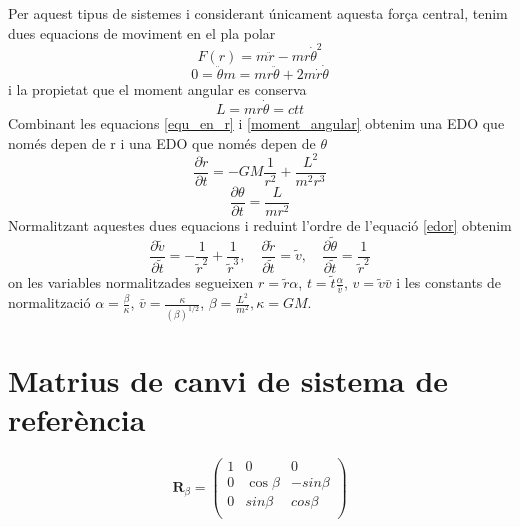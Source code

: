 \documentclass[11pt]{article}
\begin{document}
Per aquest tipus de sistemes i considerant únicament aquesta força central, tenim dues equacions de moviment en el pla polar 
\begin{equation}
    F(r)=m\ddot{r}-mr{\dot{\theta}}^2
    \label{equ_en_r}
\end{equation}
\begin{equation}
    0=\ddot{\theta}m=mr\ddot{\theta}+2m\dot{r}\dot{\theta}
    \label{equ_en_theta}
\end{equation}
i la propietat que el moment angular es conserva
\begin{equation}
    L=mr\dot{\theta}=ctt
    \label{moment_angular}
\end{equation}
Combinant les equacions \eqref{equ_en_r} i \eqref{moment_angular} obtenim una EDO que només depen de r i una EDO que només depen de $\theta$
\begin{equation}
    \frac{\partial\dot{r}}{\partial t}=-GM\frac{1}{r^2}+\frac{L^2}{m^2r^3}
    \label{edor}
\end{equation}
\begin{equation}
    \frac{\partial\theta}{\partial t}=\frac{L}{mr^2}
    \label{edot}
\end{equation}
Normalitzant aquestes dues equacions i reduint l'ordre de l'equació \eqref{edor} obtenim
\begin{equation}
    \frac{\partial\tilde{v}}{\partial\tilde{t}}=-\frac{1}{\tilde{r}^2}+\frac{1}{\tilde{r}^3}, \quad
    \frac{\partial\tilde{r}}{\partial\tilde{t}}=\tilde{v}, \quad
    \frac{\partial\tilde{\theta}}{\partial\tilde{t}}=\frac{1}{\tilde{r}^2}
    \label{eq:all}
\end{equation}
on les variables normalitzades segueixen $r=\tilde{r}\alpha$, $t=\tilde{t}\frac{\alpha}{\bar{v}}$, $v=\tilde{v}\bar{v}$ i les constants de normalització $\alpha = \frac{\beta}{\kappa}$, $\bar{v}=\frac{\kappa}{(\beta)^{1/2}}$, $\beta=\frac{L^2}{m^2}, \kappa=GM$.


\section{Matrius de canvi de sistema de referència}\label{annex: matr_rot}
\begin{equation}
    \mathbf{R}_{\beta}=
    \begin{pmatrix}
      1 & 0 & 0   \\
      0 & \cos\beta& -sin\beta \\
      0 & sin\beta & cos\beta \\
    \end{pmatrix}
\end{equation}  
\end{document}
